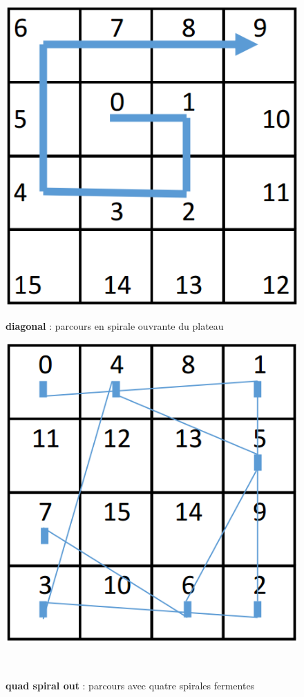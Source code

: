 	\begin{figure}[H]
		\includegraphics[width=\linewidth]{images/parcours_spiral-out.png}
		\caption{\textbf{diagonal} : parcours en spirale ouvrante du plateau}\label{fig:parcours_spiral-out}
		\endminipage\hfill
		\includegraphics[width=\linewidth]{images/parcours_quad-spiral-in.png}
		\caption{\textbf{quad spiral out} : parcours avec quatre spirales fermentes}\label{fig:quad-spiral-in}
		\endminipage\hfill
		\ %
		\endminipage\hfill
	\end{figure}
	

